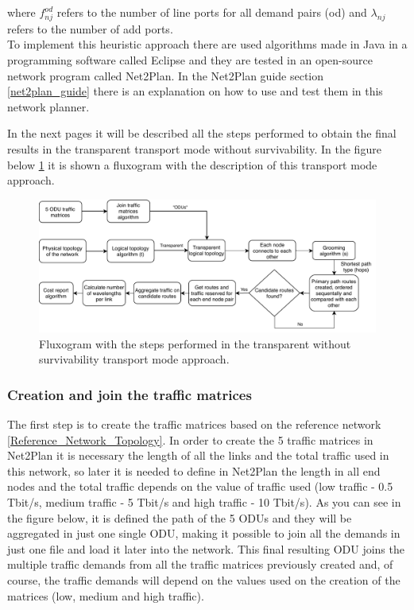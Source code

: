 \noindent
where $f_{nj}^{od}$ refers to the number of line ports for all demand pairs (od) and $\lambda_{nj}$ refers to the number of add ports.\\

\vspace{11pt}
To implement this heuristic approach there are used algorithms made in Java in a programming software called Eclipse and they are tested in an open-source network program called Net2Plan. In the Net2Plan guide section \ref{net2plan_guide} there is an explanation on how to use and test them in this network planner.

In the next pages it will be described all the steps performed to obtain the final results in the transparent transport mode without survivability. In the figure below \ref{fluxogram_transp_surv} it is shown a fluxogram with the description of this transport mode approach.

\begin{figure}[H]
\centering
\includegraphics[width=16cm]{sdf/heuristic/transparent/figures/fluxogram_transparent_surv}
\caption{Fluxogram with the steps performed in the transparent without survivability transport mode approach.}
\label{fluxogram_transp_surv}
\end{figure}

\newpage
\subsubsection{Creation and join the traffic matrices}

\noindent
The first step is to create the traffic matrices based on the reference network \ref{Reference_Network_Topology}. In order to create the 5 traffic matrices in Net2Plan it is necessary the length of all the links and the total traffic used in this network, so later it is needed to define in Net2Plan the length in all end nodes and the total traffic depends on the value of traffic used (low traffic - 0.5 Tbit/s, medium traffic - 5 Tbit/s and high traffic - 10 Tbit/s). As you can see in the figure below, it is defined the path of the 5 ODUs and they will be aggregated in just one single ODU, making it possible to join all the demands in just one file and load it later into the network. This final resulting ODU joins the multiple traffic demands from all the traffic matrices previously created and, of course, the traffic demands will depend on the values used on the creation of the matrices (low, medium and high traffic).

